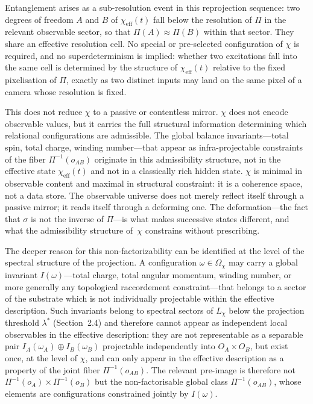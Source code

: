   Entanglement arises as a sub-resolution event in this reprojection sequence:
  two degrees of freedom $A$ and $B$ of $\chi_{\mathrm{eff}}(t)$ fall below
  the resolution of $\Pi$ in the relevant observable sector, so that
  $\Pi(A) \approx \Pi(B)$ within that sector.
  They share an effective resolution cell.
  No special or pre-selected configuration of $\chi$ is required, and no
  superdeterminism is implied: whether two excitations fall into the same
  cell is determined by the structure of $\chi_{\mathrm{eff}}(t)$ relative
  to the fixed pixelisation of $\Pi$, exactly as two distinct inputs may
  land on the same pixel of a camera whose resolution is fixed.

  This does not reduce $\chi$ to a passive or contentless mirror.
  $\chi$ does not encode observable values, but it carries the full
  structural information determining which relational configurations are
  admissible.
  The global balance invariants---total spin, total charge, winding
  number---that appear as infra-projectable constraints of the fiber
  $\Pi^{-1}(o_{AB})$ originate in this admissibility structure, not in the
  effective state $\chi_{\mathrm{eff}}(t)$ and not in a classically rich
  hidden state.
  $\chi$ is minimal in observable content and maximal in structural
  constraint: it is a coherence space, not a data store.
  The observable universe does not merely reflect itself through a passive
  mirror; it reads itself through a deforming one.
  The deformation---the fact that $\sigma$ is not the inverse of $\Pi$---is
  what makes successive states different, and what the admissibility
  structure of~$\chi$ constrains without prescribing.

  The deeper reason for this non-factorizability can be identified at the
  level of the spectral structure of the projection.
  A configuration $\omega \in \Omega_\chi$ may carry a global
  invariant $I(\omega)$---total charge, total angular momentum, winding
  number, or more generally any topological raccordement constraint---that
  belongs to a sector of the substrate which is not individually projectable
  within the effective description.
  Such invariants belong to spectral sectors of $L_\chi$ below the
  projection threshold $\lambda^*$ (Section~2.4) and therefore cannot appear
  as independent local observables in the effective description: they are not
  representable as a separable pair $I_A(\omega_A) \oplus I_B(\omega_B)$
  projectable independently into $O_A \times O_B$, but exist once, at the
  level of $\chi$, and can only appear in the effective description as a
  property of the joint fiber $\Pi^{-1}(o_{AB})$.
  The relevant pre-image is therefore not $\Pi^{-1}(o_A) \times \Pi^{-1}(o_B)$
  but the non-factorisable global class $\Pi^{-1}(o_{AB})$, whose elements
  are configurations constrained jointly by $I(\omega)$.

